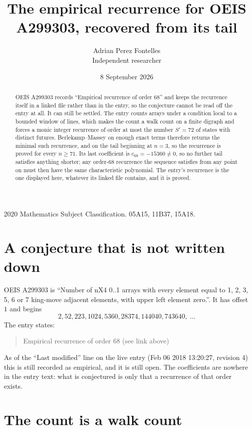 \documentclass[11pt,a4paper]{article}
\title{The empirical recurrence for OEIS A299303, recovered from its tail}
\author{Adrian Perez Fontelles\\ \small Independent researcher}
\date{8 September 2026}
\theoremstyle{plain}
\theoremstyle{definition}
\begin{document}
\maketitle

\begin{abstract}
OEIS A299303 records ``Empirical recurrence of order $68$'' and keeps the recurrence itself in
a linked file rather than in the entry, so the conjecture cannot be read off the entry at all.
It can still be settled. The entry counts arrays under a condition local to a bounded window of
lines, which makes the count a walk count on a finite digraph and forces a monic integer
recurrence of order at most the number $S'=72$ of states with distinct futures. Berlekamp--Massey on
enough exact terms therefore returns the minimal such recurrence, and on the tail beginning at $n=3$, so the recurrence is proved for every $n\ge71$.
Its last coefficient is $c_{68}=-15360\neq0$, so no further tail satisfies anything
shorter; any order-$68$ recurrence the sequence satisfies from any point on must then have
the same characteristic polynomial. The entry's recurrence is the one displayed here, whatever
its linked file contains, and it is proved.
\end{abstract}

\noindent\small 2020 Mathematics Subject Classification. 05A15, 11B37, 15A18.\normalsize

\section{A conjecture that is not written down}

OEIS A299303 is ``Number of nX4 0..1 arrays with every element equal to 1, 2, 3, 5, 6 or 7 king-move adjacent elements, with upper left element zero.''. It has offset $1$ and begins
\[
2, 52, 223, 1024, 5360, 28374, 144040, 743640,\ \dots
\]
The entry states:
\begin{quote}
Empirical recurrence of order 68 (see link above)
\end{quote}
As of the ``Last modified'' line on the live entry (Feb 06 2018 13:20:27, revision 4)
this is still recorded as empirical, and it is still open. The coefficients are nowhere in the
entry text: what is conjectured is only that a recurrence of that order exists.

\section{The count is a walk count}
\end{document}
